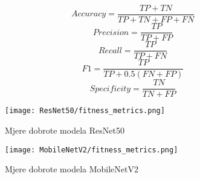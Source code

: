 \documentclass[conference, utf8]{IEEEtran}
\begin{document}
	\begin{equation}
		Accuracy = \frac{TP + TN}{TP + TN + FP + FN} \label{eq:1}
	\end{equation}
	\begin{equation}
		Precision = \frac{TP}{TP + FP} \label{eq:2}
	\end{equation}
	\begin{equation}
		Recall = \frac{TP}{TP + FN} \label{eq:3}
	\end{equation}
	\begin{equation}
		F1 = \frac{TP}{TP + 0.5(FN + FP)}\label{eq:4}
	\end{equation}
	\begin{equation}
		Specificity = \frac{TN}{TN + FP} \label{eq:5}
	\end{equation}
	
	
	\begin{figure}[H]
		\centering
		\texttt{[image: ResNet50/fitness\_metrics.png]}
		\caption{Mjere dobrote modela ResNet50}
		\label{fig:RN50_fit_met}
	\end{figure}
	
	
	
	\begin{figure}[H]
		\centering
		\texttt{[image: MobileNetV2/fitness\_metrics.png]}
		\caption{Mjere dobrote modela MobileNetV2}
		\label{fig:MN_fit_met}
	\end{figure}
	
	
	
	
\end{document}
